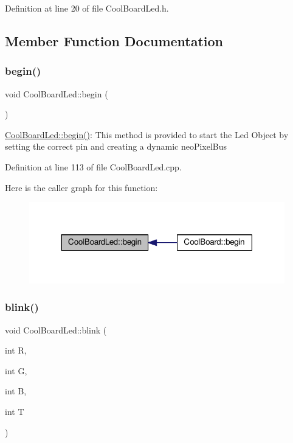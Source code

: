 Definition at line 20 of file Cool\+Board\+Led.\+h.



\subsection{Member Function Documentation}
\mbox{\label{class_cool_board_led_ae3cbde8affcc6f011cbd698c8ef911f6}} 
\subsubsection{\texorpdfstring{begin()}{begin()}}
{\footnotesize\ttfamily void Cool\+Board\+Led\+::begin (\begin{DoxyParamCaption}{ }\end{DoxyParamCaption})}

\hyperlink{class_cool_board_led_ae3cbde8affcc6f011cbd698c8ef911f6}{Cool\+Board\+Led\+::begin()}\+: This method is provided to start the Led Object by setting the correct pin and creating a dynamic neo\+Pixel\+Bus 

Definition at line 113 of file Cool\+Board\+Led.\+cpp.

Here is the caller graph for this function\+:\nopagebreak
\begin{figure}[H]
\begin{center}
\leavevmode
\includegraphics[width=315pt]{class_cool_board_led_ae3cbde8affcc6f011cbd698c8ef911f6_icgraph}
\end{center}
\end{figure}
\mbox{\label{class_cool_board_led_a27706bc029f6a126c55d0b91624ad7fa}} 
\subsubsection{\texorpdfstring{blink()}{blink()}}
{\footnotesize\ttfamily void Cool\+Board\+Led\+::blink (\begin{DoxyParamCaption}\item[{int}]{R,  }\item[{int}]{G,  }\item[{int}]{B,  }\item[{int}]{T }\end{DoxyParamCaption})}

